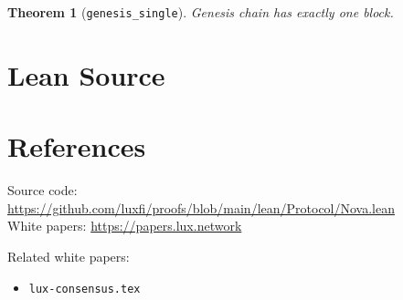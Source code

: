 \documentclass[11pt]{article}
\newtheorem{theorem}{Theorem}
\begin{document}
\begin{theorem}[\texttt{genesis\_single}]
Genesis chain has exactly one block.
\end{theorem}


\section{Lean Source}


\section{References}
\noindent Source code: \url{https://github.com/luxfi/proofs/blob/main/lean/Protocol/Nova.lean}\\
\noindent White papers: \url{https://papers.lux.network}

\noindent Related white papers:
\begin{itemize}
  \item \texttt{lux-consensus.tex}
\end{itemize}
\end{document}
